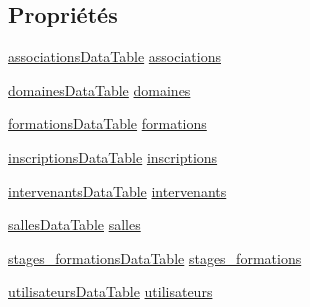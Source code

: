 \subsection*{Propriétés}
\begin{DoxyCompactItemize}
\item 
\hyperlink{classforma_1_1formadb_data_set_1_1associations_data_table}{associations\+Data\+Table} \hyperlink{classforma_1_1formadb_data_set_afc49a276b6c265414abdfe8eabfbd7aa}{associations}
\item 
\hyperlink{classforma_1_1formadb_data_set_1_1domaines_data_table}{domaines\+Data\+Table} \hyperlink{classforma_1_1formadb_data_set_a6b58058e47e19091a6cd9d3308477342}{domaines}
\item 
\hyperlink{classforma_1_1formadb_data_set_1_1formations_data_table}{formations\+Data\+Table} \hyperlink{classforma_1_1formadb_data_set_afb2a93acda2d3ad5596b5d64ccfd80be}{formations}
\item 
\hyperlink{classforma_1_1formadb_data_set_1_1inscriptions_data_table}{inscriptions\+Data\+Table} \hyperlink{classforma_1_1formadb_data_set_a799cd7282e221e2cfdeb078c999fc7a0}{inscriptions}
\item 
\hyperlink{classforma_1_1formadb_data_set_1_1intervenants_data_table}{intervenants\+Data\+Table} \hyperlink{classforma_1_1formadb_data_set_a42e26d4ba5e88732658aa1b80cef9f99}{intervenants}
\item 
\hyperlink{classforma_1_1formadb_data_set_1_1salles_data_table}{salles\+Data\+Table} \hyperlink{classforma_1_1formadb_data_set_afdbc12af391f95459ebdefdf335fa4cb}{salles}
\item 
\hyperlink{classforma_1_1formadb_data_set_1_1stages__formations_data_table}{stages\+\_\+formations\+Data\+Table} \hyperlink{classforma_1_1formadb_data_set_ad92c2b18286a7967bcdfbc3e40eb515e}{stages\+\_\+formations}
\item 
\hyperlink{classforma_1_1formadb_data_set_1_1utilisateurs_data_table}{utilisateurs\+Data\+Table} \hyperlink{classforma_1_1formadb_data_set_a2e378872936fbedc3fe03e0b800a5dfe}{utilisateurs}

\end{DoxyCompactItemize}
